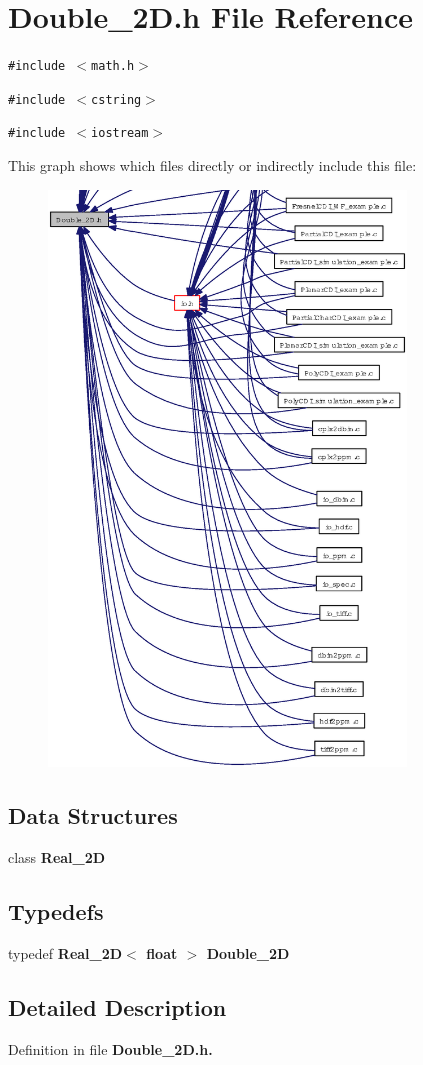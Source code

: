 \section{Double\_\-2D.h File Reference}
\label{Double__2D_8h}
{\tt \#include $<$math.h$>$}\par
{\tt \#include $<$cstring$>$}\par
{\tt \#include $<$iostream$>$}\par


This graph shows which files directly or indirectly include this file:\begin{figure}[H]
\begin{center}
\leavevmode
\includegraphics[width=269pt]{Double__2D_8h__dep__incl}
\end{center}
\end{figure}
\subsection*{Data Structures}
\begin{CompactItemize}
\item 
class \bf{Real\_\-2D}
\end{CompactItemize}
\subsection*{Typedefs}
\begin{CompactItemize}
\item 
typedef \bf{Real\_\-2D}$<$ float $>$ \bf{Double\_\-2D}\label{Double__2D_8h_5779de4782f879e627137c31aea683ea}

\end{CompactItemize}


\subsection{Detailed Description}


Definition in file \bf{Double\_\-2D.h}.